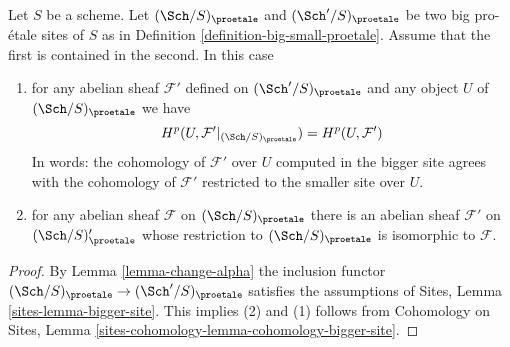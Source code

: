 \begin{lemma}
\label{lemma-cohomology-enlarge-partial-universe}
Let $S$ be a scheme. Let $(\Sch/S)_\proetale$ and $(\Sch'/S)_\proetale$ be two
big pro-\'etale sites of $S$ as in
Definition \ref{definition-big-small-proetale}.
Assume that the first is contained in
the second. In this case
\begin{enumerate}
\item for any abelian sheaf $\mathcal{F}'$ defined on $(\Sch'/S)_\proetale$
and any object $U$ of $(\Sch/S)_\proetale$ we have
$$
H^p(U, \mathcal{F}'|_{(\Sch/S)_\proetale}) =
H^p(U, \mathcal{F}')
$$
In words: the cohomology of $\mathcal{F}'$ over $U$ computed in the bigger site
agrees with the cohomology of $\mathcal{F}'$ restricted to the smaller site
over $U$.
\item for any abelian sheaf $\mathcal{F}$ on $(\Sch/S)_\proetale$ there is an
abelian sheaf $\mathcal{F}'$ on $(\Sch/S)_\proetale'$ whose restriction to
$(\Sch/S)_\proetale$ is isomorphic to $\mathcal{F}$.
\end{enumerate}
\end{lemma}

\begin{proof}
By Lemma \ref{lemma-change-alpha} the inclusion functor
$(\Sch/S)_\proetale \to (\Sch'/S)_\proetale$ satisfies the assumptions of
Sites, Lemma \ref{sites-lemma-bigger-site}. This implies (2) and (1)
follows from
Cohomology on Sites, Lemma \ref{sites-cohomology-lemma-cohomology-bigger-site}.
\end{proof}
















